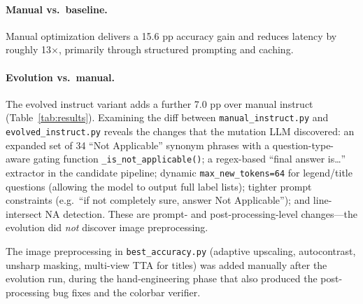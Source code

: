 \documentclass{article}
\begin{document}
\paragraph{Manual vs.\ baseline.}
Manual optimization delivers a 15.6 pp accuracy gain and reduces latency by
roughly 13$\times$, primarily through structured prompting and caching.

\paragraph{Evolution vs.\ manual.}
The evolved instruct variant adds a further 7.0 pp over manual instruct
(Table~\ref{tab:results}). Examining the diff between \texttt{manual\_instruct.py}
and \texttt{evolved\_instruct.py} reveals the changes that the mutation LLM
discovered: an expanded set of 34 ``Not Applicable'' synonym phrases with a
question-type-aware gating function \texttt{\_is\_not\_applicable()}; a
regex-based ``final answer is\ldots'' extractor in the candidate pipeline;
dynamic \texttt{max\_new\_tokens=64} for legend/title questions (allowing the
model to output full label lists); tighter prompt constraints (e.g.\ ``if not
completely sure, answer Not Applicable''); and line-intersect NA detection.
These are prompt- and post-processing-level changes---the evolution did
\emph{not} discover image preprocessing.

The image preprocessing in \texttt{best\_accuracy.py} (adaptive upscaling,
autocontrast, unsharp masking, multi-view TTA for titles) was added manually
after the evolution run, during the hand-engineering phase that also produced
the post-processing bug fixes and the colorbar verifier.
\end{document}
